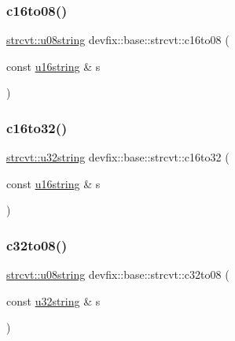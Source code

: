 \mbox{\label{structdevfix_1_1base_1_1strcvt_a45c7479d1adbebb5ed2c35f3f34dad60}} 
\subsubsection{\texorpdfstring{c16to08()}{c16to08()}}
{\footnotesize\ttfamily \hyperlink{structdevfix_1_1base_1_1strcvt_ad2a80b923d1d235cee3d4cd0bc560b64}{strcvt\+::u08string} devfix\+::base\+::strcvt\+::c16to08 (\begin{DoxyParamCaption}\item[{const \hyperlink{structdevfix_1_1base_1_1strcvt_a33a324a669607cdb717d84bbfa1f844b}{u16string} \&}]{s }\end{DoxyParamCaption})\hspace{0.3cm}{\ttfamily [static]}}

\mbox{\label{structdevfix_1_1base_1_1strcvt_a2f1f217dca92b8043e9e8ba298caede9}} 
\subsubsection{\texorpdfstring{c16to32()}{c16to32()}}
{\footnotesize\ttfamily \hyperlink{structdevfix_1_1base_1_1strcvt_a34f169167c3c7c1315df2eca9d5532d7}{strcvt\+::u32string} devfix\+::base\+::strcvt\+::c16to32 (\begin{DoxyParamCaption}\item[{const \hyperlink{structdevfix_1_1base_1_1strcvt_a33a324a669607cdb717d84bbfa1f844b}{u16string} \&}]{s }\end{DoxyParamCaption})\hspace{0.3cm}{\ttfamily [static]}}

\mbox{\label{structdevfix_1_1base_1_1strcvt_a0ccc0689bd1a56aae9c10364d100943e}} 
\subsubsection{\texorpdfstring{c32to08()}{c32to08()}}
{\footnotesize\ttfamily \hyperlink{structdevfix_1_1base_1_1strcvt_ad2a80b923d1d235cee3d4cd0bc560b64}{strcvt\+::u08string} devfix\+::base\+::strcvt\+::c32to08 (\begin{DoxyParamCaption}\item[{const \hyperlink{structdevfix_1_1base_1_1strcvt_a34f169167c3c7c1315df2eca9d5532d7}{u32string} \&}]{s }\end{DoxyParamCaption})\hspace{0.3cm}{\ttfamily [static]}}

